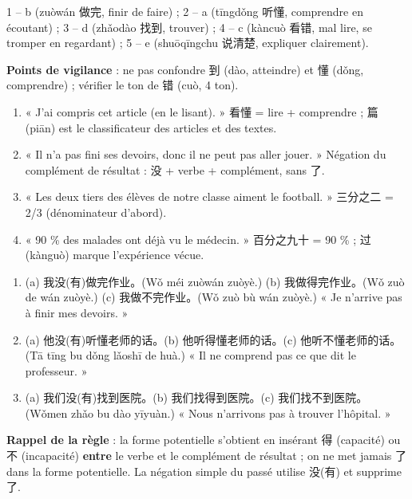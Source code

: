 \documentclass[11pt]{article}
\begin{document}
\begin{corrige}
1 -- b (zuòwán 做完, finir de faire) ; 2 -- a (tīngdǒng 听懂, comprendre en écoutant) ; 3 -- d (zhǎodào 找到, trouver) ; 4 -- c (kàncuò 看错, mal lire, se tromper en regardant) ; 5 -- e (shuōqīngchu 说清楚, expliquer clairement).

\textbf{Points de vigilance} : ne pas confondre 到 (dào, atteindre) et 懂 (dǒng, comprendre) ; vérifier le ton de 错 (cuò, 4 ton).
\end{corrige}

\begin{corrige}
\begin{enumerate}
\item « J'ai compris cet article (en le lisant). » 看懂 = lire + comprendre ; 篇 (piān) est le classificateur des articles et des textes.
\item « Il n'a pas fini ses devoirs, donc il ne peut pas aller jouer. » Négation du complément de résultat : 没 + verbe + complément, sans 了.
\item « Les deux tiers des élèves de notre classe aiment le football. » 三分之二 = 2/3 (dénominateur d'abord).
\item « 90 \% des malades ont déjà vu le médecin. » 百分之九十 = 90 \% ; 过 (kànguò) marque l'expérience vécue.
\end{enumerate}
\end{corrige}

\begin{corrige}
\begin{enumerate}
\item (a) 我没(有)做完作业。(Wǒ méi zuòwán zuòyè.) (b) 我做得完作业。(Wǒ zuò de wán zuòyè.) (c) 我做不完作业。(Wǒ zuò bù wán zuòyè.) « Je n'arrive pas à finir mes devoirs. »
\item (a) 他没(有)听懂老师的话。(b) 他听得懂老师的话。(c) 他听不懂老师的话。(Tā tīng bu dǒng lǎoshī de huà.) « Il ne comprend pas ce que dit le professeur. »
\item (a) 我们没(有)找到医院。(b) 我们找得到医院。(c) 我们找不到医院。(Wǒmen zhǎo bu dào yīyuàn.) « Nous n'arrivons pas à trouver l'hôpital. »
\end{enumerate}
\textbf{Rappel de la règle} : la forme potentielle s'obtient en insérant 得 (capacité) ou 不 (incapacité) \textbf{entre} le verbe et le complément de résultat ; on ne met jamais 了 dans la forme potentielle. La négation simple du passé utilise 没(有) et supprime 了.
\end{corrige}
\end{document}
